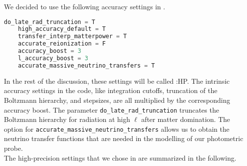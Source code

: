 \documentclass[../main.tex]{subfiles}
\begin{document}
We decided to use the following accuracy settings in \camb.  
\begin{lstlisting}[language=Python,caption=\camb:HP precision settings]
    do_late_rad_truncation = T
    high_accuracy_default = T
    transfer_interp_matterpower = T
    accurate_reionization = F
    accuracy_boost = 3
    l_accuracy_boost = 3
    accurate_massive_neutrino_transfers = T
\end{lstlisting} 
In the rest of the discussion, these settings will be called \camb:HP. The intrinsic accuracy settings in the code, like integration cutoffs, truncation of the Boltzmann hierarchy, and stepsizes, are all multiplied by the corresponding accuracy boost. The parameter {\tt do\_late\_rad\_truncation} truncates the Boltzmann hierarchy for radiation at high $\ell$ after matter domination. The option for {\tt accurate\_massive\_neutrino\_transfers} allows us to obtain the neutrino transfer functions that are needed in the modelling of our photometric probe.\\
The high-precision settings that we chose in \class are summarized in the following.
\end{document}
